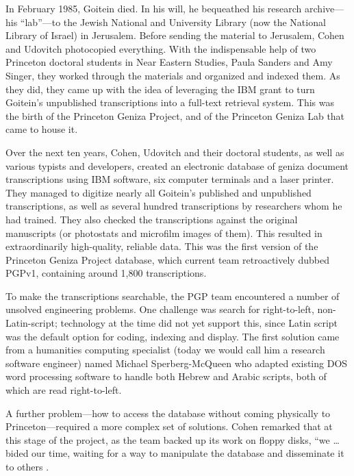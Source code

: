 \documentclass{article}
\begin{document}
In February 1985, Goitein died. In his will, he bequeathed his research archive—his “lab”—to the Jewish National and University Library (now the National Library of Israel) in Jerusalem. Before sending the material to Jerusalem, Cohen and Udovitch photocopied everything. With the indispensable help of two Princeton doctoral students in Near Eastern Studies, Paula Sanders and Amy Singer, they worked through the materials and organized and indexed them. As they did, they came up with the idea of leveraging the IBM grant to turn Goitein’s unpublished transcriptions into a full-text retrieval system. This was the birth of the Princeton Geniza Project, and of the Princeton Geniza Lab that came to house it.

Over the next ten years, Cohen, Udovitch and their doctoral students, as well as various typists and developers, created an electronic database of geniza document transcriptions using IBM software, six computer terminals and a laser printer. They managed to digitize nearly all Goitein’s published and unpublished transcriptions, as well as several hundred transcriptions by researchers whom he had trained. They also checked the transcriptions against the original manuscripts (or photostats and microfilm images of them). This resulted in extraordinarily high-quality, reliable data. This was the first version of the Princeton Geniza Project database, which  current team retroactively dubbed PGPv1, containing around 1,800 transcriptions.

To make the transcriptions searchable, the PGP team encountered a number of unsolved engineering problems. One challenge was search for right-to-left, non-Latin-script; technology at the time did not yet support this, since Latin script was the default option for coding, indexing and display. The first solution came from a humanities computing specialist (today we would call him a research software engineer) named Michael Sperberg-McQueen who adapted existing DOS word processing software to handle both Hebrew and Arabic scripts, both of which are read right-to-left. 

A further problem—how to access the database without coming physically to Princeton—required a more complex set of solutions. Cohen remarked that at this stage of the project, as the team backed up its work on floppy disks, “we … bided our time, waiting for a way to manipulate the database and disseminate it to others \autocite[40]{cohen_princeton_2014}.
\end{document}
